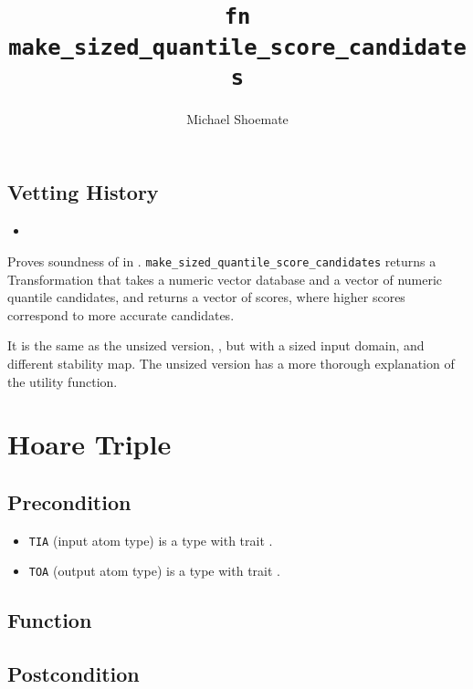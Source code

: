 \documentclass{article}
\title{\texttt{fn make\_sized\_quantile\_score\_candidates}}
\author{Michael Shoemate}
\begin{document}
\maketitle  

\contrib

\subsection*{Vetting History}
\begin{itemize}
    \item {}
\end{itemize}

Proves soundness of  
in .
\texttt{make\_sized\_quantile\_score\_candidates} returns a Transformation that 
takes a numeric vector database and a vector of numeric quantile candidates,
and returns a vector of scores, where higher scores correspond to more accurate candidates.

It is the same as the unsized version, , 
but with a sized input domain, and different stability map.
The unsized version has a more thorough explanation of the utility function.

\section{Hoare Triple}
\subsection*{Precondition}
\begin{itemize}
    \item \texttt{TIA} (input atom type) is a type with trait .
    \item \texttt{TOA} (output atom type) is a type with trait .
\end{itemize}


\subsection*{Function}
\label{sec:sized-python-pseudocode}


\subsection*{Postcondition}
\end{document}
